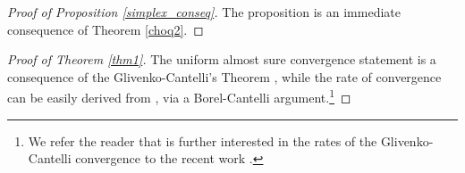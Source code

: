 \documentclass[12pt, reqno]{amsart}
\theoremstyle{definition}
\begin{document}
\begin{proof}[Proof of Proposition \ref{simplex_conseq}]
The proposition is an immediate consequence of 
Theorem \ref{choq2}.
\end{proof}





\begin{proof}[Proof of Theorem \ref{thm1}]
The uniform almost sure convergence statement is a consequence of the Glivenko-Cantelli's Theorem \cite{vdv_asy}, while the rate of convergence can be easily derived from \cite[Lemma 2.1]{zhou}, via a Borel-Cantelli argument.\footnote{We refer the reader that is further interested in the rates of the Glivenko-Cantelli convergence to the recent work \cite{dolera}.}
\end{proof}
%
\end{document}
